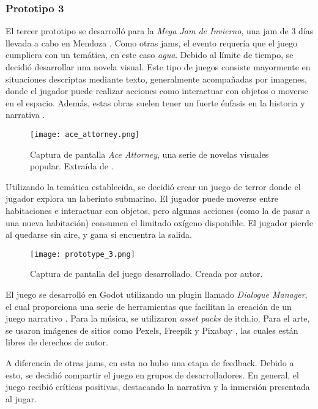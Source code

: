 \subsubsection{Prototipo 3}
El tercer prototipo se desarrolló para la \textit{Mega Jam de Invierno}, una jam de 3 días llevada a cabo en Mendoza \cite{MEGAJAMInvierno}. Como otras jams, el evento requería que el juego cumpliera con un temática, en este caso \textit{agua}.
Debido al límite de tiempo, se decidió desarrollar una novela visual. Este tipo de juegos consiste mayormente en situaciones descriptas mediante texto, generalmente acompañadas por imagenes, donde el jugador puede realizar acciones como interactuar con objetos o moverse en el espacio. Además, estas obras suelen tener un fuerte énfasis en la historia y narrativa \cite{VisualNovel2025}.
%
\begin{figure}[H]
  \centering
  \texttt{[image: ace\_attorney.png]}
  \caption{Captura de pantalla \textit{Ace Attorney}, una serie de novelas visuales popular. Extraída de \cite{FilePhoenixWright2020}.}
  \label{fig:x ejemplo novela visual} 
\end{figure}
%
\par Utilizando la temática establecida, se decidió crear un juego de terror donde el jugador explora un laberinto submarino. El jugador puede moverse entre habitaciones e interactuar con objetos, pero algunas acciones (como la de pasar a una nueva habitación) consumen el limitado oxígeno disponible. El jugador pierde al quedarse sin aire, y gana si encuentra la salida.
%
\begin{figure}[H]
  \centering
  \texttt{[image: prototype\_3.png]}
  \caption{Captura de pantalla del juego desarrollado. Creada por autor.}
  \label{fig:x prototypo 3 captura} 
\end{figure}
%
\par El juego se desarrolló en Godot utilizando un plugin llamado \textit{Dialogue Manager}, el cual proporciona una serie de herramientas que facilitan la creación de un juego narrativo \cite{NathanhoadGodot_dialogue_managerPowerful}. Para la música, se utilizaron \textit{asset packs} de itch.io. Para el arte, se usaron imágenes de sitios como Pexels, Freepik y Pixabay \cite{57MillionStunning,FreepikAllinOneAI,FotosStockGratis}, las cuales están libres de derechos de autor.
\bigbreak
\par A diferencia de otras jams, en esta no hubo una etapa de feedback. Debido a esto, se decidió compartir el juego en grupos de desarrolladores. En general, el juego recibió críticas positivas, destacando la narrativa y la inmersión presentada al jugar.
%

